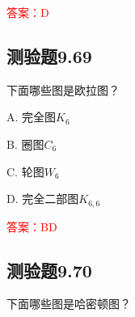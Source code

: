 \documentclass[UTF8, heading=true]{ctexart}
\begin{document}
\textcolor{red}{答案：D}

\subsection{测验题9.69}

下面哪些图是欧拉图？

A. 完全图$K_6$

B. 圈图$C_6$

C. 轮图$W_6$

D. 完全二部图$K_{6,6}$

\textcolor{red}{答案：BD}

\subsection{测验题9.70}

下面哪些图是哈密顿图？
\end{document}
